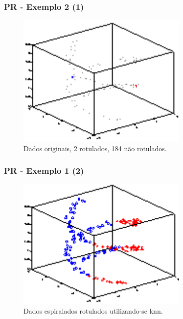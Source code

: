 \documentclass{beamer}
\begin{document}
      \frame
      {
        \frametitle{PR - Exemplo 2 (1)}
        \begin{figure}[!h]
          \begin{center}
                  \includegraphics[width=0.75\textwidth]{prop2-dados}
          \end{center}
            \caption{Dados originais, 2 rotulados, 184 não rotulados.}
        \end{figure}
      }

      \frame
      {
        \frametitle{PR - Exemplo 1 (2)}
        \begin{figure}[!h]
          \begin{center}
                  \includegraphics[width=0.75\textwidth]{prop2-dados-knn}
          \end{center}
            \caption{Dados espiralados rotulados utilizando-se knn.}
        \end{figure}
      }
\end{document}
